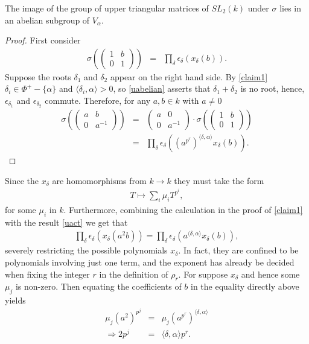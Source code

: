 \begin{corollary} The image of the group of upper triangular matrices of $SL_2(k)$ under $\sigma$ lies in an abelian subgroup of $V_\alpha$.
\end{corollary}
\begin{proof}
First consider
\begin{eqnarray*}
\sigma\left(\left( \begin{matrix} 1 & b \\ 0 & 1 \end{matrix}\right)\right) &=& \prod_\delta \epsilon_\delta\left(x_\delta(b)\right).
\end{eqnarray*}
Suppose the roots $\delta_1$ and $\delta_2$ appear on the right hand side. By \ref{claim1} $\delta_i \in \Phi^+ - \{\alpha\}$ and $\langle \delta_i, \alpha \rangle > 0$, so \ref{uabelian} asserts that $\delta_1 + \delta_2$ is no root, hence, $\epsilon_{\delta_1}$ and $\epsilon_{\delta_2}$ commute. Therefore, for any $a, b\in k$ with $a\neq 0$
\begin{eqnarray*}
\sigma\left(\left(\begin{matrix} a & b \\ 0 & a^{-1}\end{matrix}\right)\right) 
&=& \left(\begin{matrix} a & 0 \\ 0 & a^{-1}\end{matrix} \right) \cdot
\sigma\left(\left(\begin{matrix} 1 & b \\ 0 & 1\end{matrix}\right)\right) \\
&=& \prod_\delta \epsilon_\delta\left((a^{p^r})^{\langle \delta, \alpha \rangle}x_\delta\left(b\right)\right).
\end{eqnarray*}
\end{proof}

Since the $x_\delta$ are homomorphisms from $k\rightarrow k$ they must take the form
\begin{eqnarray*}
T\mapsto\sum_i \mu_i T^{p^i},
\end{eqnarray*}
for some $\mu_i$ in $k$. Furthermore, combining the calculation in the proof of \ref{claim1} with the result \ref{uact} we get that
\begin{eqnarray*}
\prod_\delta \epsilon_\delta\left(x_\delta\left(a^2b\right)\right) = \prod_\delta \epsilon_\delta\left(a^{\langle \delta, \alpha \rangle}x_\delta\left(b\right)\right),
\end{eqnarray*}
severely restricting the possible polynomials $x_\delta$. In fact, they are confined to be polynomials involving just one term, and the exponent has already be decided when fixing the integer $r$ in the definition of $\rho_r$. For suppose $x_\delta$ and hence some $\mu_j$ is non-zero. Then equating the coefficients of $b$ in the equality directly above yields
\begin{eqnarray*}
\mu_j(a^2)^{p^j} &=& \mu_j \left(a^{p^r}\right)^{\langle \delta, \alpha\rangle}\\
\Longrightarrow2p^j &=& \langle \delta, \alpha \rangle p^r.
\end{eqnarray*}

